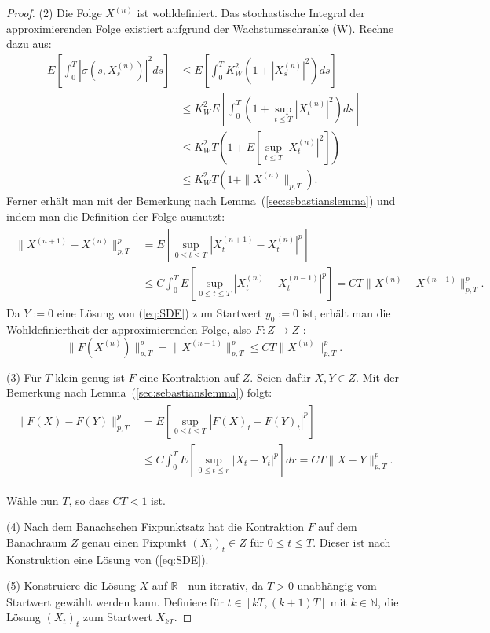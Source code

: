 \documentclass[10pt, a4paper, leqno, twoside, bibliography=totocnumbered, final]{scrartcl}
\theoremstyle{definition}
\theoremstyle{plain}%
\theoremstyle{remark}
\begin{document}
\begin{proof}
(2) Die Folge $ X^{(n)} $ ist wohldefiniert. 
Das stochastische Integral der approximierenden Folge existiert aufgrund der Wachstumsschranke (W). Rechne dazu aus:
\begin{align*}
E \left[ \int_0^T \left| \sigma(s,X_{s}^{(n)}) \right|^2 ds \right] & \leq E \left[ \int_0^T K_W^2 \left(1 + \left|X_{s}^{(n)}\right|^2 \right) ds \right] \\
&  \leq K_W^2 E \left[ \int_0^T \left(1 + \sup_{t \leq T} \left|X_{t}^{(n)}\right|^2 \right) ds \right] \\
&  \leq K_W^2 T \left( 1 + E \left[ \sup_{t \leq T} \left|X_{t}^{(n)}\right|^2 \right] \right) \\
&  \leq K_W^2 T \left( 1 + \| X^{(n)} \|_{p,T} \right).
\end{align*}
Ferner erhält man mit der Bemerkung nach Lemma~(\ref{sec:sebastianslemma}) und indem man die Definition der Folge ausnutzt:
\begin{align*}
\begin{split}
\|  X^{(n+1)} - X^{(n)} \|_{p,T}^p & = E \left[ \sup_{0 \leq t \leq T} \left| X^{(n+1)}_t - X^{(n)}_t \right|^p  \right] \\
& \leq C \int_0^T E \left[ \sup_{0 \leq t \leq T} \left| X^{(n)}_t - X^{(n-1)}_t \right|^p  \right] = CT \|  X^{(n)} - X^{(n-1)} \|_{p,T}^p.
\end{split}
\end{align*}
Da $ Y := 0 $ eine Lösung von (\ref{eq:SDE}) zum Startwert $ y_0 := 0 $ ist, erhält man die Wohldefiniertheit der approximierenden Folge, also $ F : Z \to Z $ :
\begin{equation*}
\|  F ( X^{(n)} ) \|_{p,T}^p = \|  X^{(n+1)} \|_{p,T}^p   \leq CT \|  X^{(n)}  \|_{p,T}^p.
\end{equation*}

(3) Für $ T $ klein genug ist $ F $ eine Kontraktion auf $ Z $. Seien dafür $ X,Y \in Z $. Mit der Bemerkung nach Lemma~(\ref{sec:sebastianslemma}) folgt:
\begin{align*}
\begin{split}
\| F (X) - F (Y) \|^p_{p,T} & = E \left[ \sup_{0 \leq t \leq T} | F(X)_t - F(Y)_t |^p  \right] \\
&  \leq C \int_0^T E \left[ \sup_{0 \leq t \leq r} |X_t - Y_t |^p  \right] dr = CT \|  X - Y \|_{p,T}^p.
\end{split}
\end{align*}

Wähle nun $ T $, so dass $ CT < 1 $ ist.

(4) Nach dem Banachschen Fixpunktsatz hat die Kontraktion $ F $ auf dem Banachraum $ Z $ genau einen Fixpunkt $ (X_t)_t \in Z $ für $ 0 \leq t \leq T $. Dieser ist nach Konstruktion eine Lösung von (\ref{eq:SDE}).

(5) Konstruiere die Lösung $ X $ auf $ \mathbb{R}_+ $ nun iterativ,  da $ T>0 $ unabhängig vom Startwert gewählt werden kann. Definiere für $ t \in [kT,(k+1)T] $ mit $ k \in \mathbb{N} $, die Lösung $ (X_t)_t $ zum Startwert $ X_{kT} $.

\end{proof}
\end{document}
